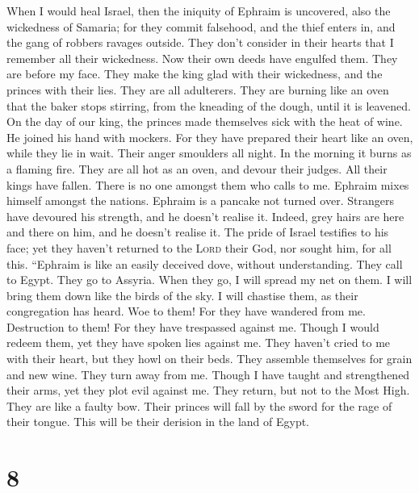  When I would heal Israel, then the iniquity of Ephraim is
uncovered, also the wickedness of Samaria; for they commit falsehood,
and the thief enters in, and the gang of robbers ravages outside.
 They don't consider in their hearts that I remember all
their wickedness. Now their own deeds have engulfed them. They are
before my face.  They make the king glad with their
wickedness, and the princes with their lies.  They are all
adulterers. They are burning like an oven that the baker stops stirring,
from the kneading of the dough, until it is leavened.  On
the day of our king, the princes made themselves sick with the heat of
wine. He joined his hand with mockers.  For they have
prepared their heart like an oven, while they lie in wait. Their anger
smoulders all night. In the morning it burns as a flaming fire.
 They are all hot as an oven, and devour their judges. All
their kings have fallen. There is no one amongst them who calls to me.
 Ephraim mixes himself amongst the nations. Ephraim is a
pancake not turned over.  Strangers have devoured his
strength, and he doesn't realise it. Indeed, grey hairs are here and
there on him, and he doesn't realise it.  The pride of
Israel testifies to his face; yet they haven't returned to the
\textsc{Lord} their God, nor sought him, for all this. 
``Ephraim is like an easily deceived dove, without understanding. They
call to Egypt. They go to Assyria.  When they go, I will
spread my net on them. I will bring them down like the birds of the sky.
I will chastise them, as their congregation has heard. 
Woe to them! For they have wandered from me. Destruction to them! For
they have trespassed against me. Though I would redeem them, yet they
have spoken lies against me.  They haven't cried to me
with their heart, but they howl on their beds. They assemble themselves
for grain and new wine. They turn away from me.  Though I
have taught and strengthened their arms, yet they plot evil against me.
 They return, but not to the Most High. They are like a
faulty bow. Their princes will fall by the sword for the rage of their
tongue. This will be their derision in the land of Egypt.

\hypertarget{section-7}{%
\section{8}\label{section-7}}

